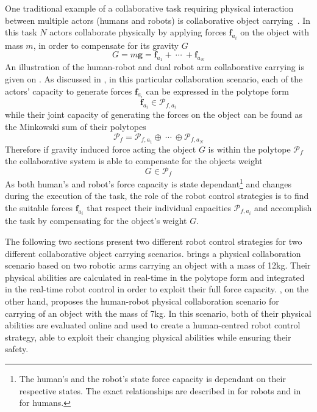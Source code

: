 One traditional example of a collaborative task requiring physical interaction between multiple actors (humans and robots) is collaborative object carrying~\cite{Arai2000carrying,Kosuge1997carrying,Tsumugiwa2002carrying}. In this task $N$ actors collaborate physically by applying forces $\bm{f}_{a_i}$ on the object with mass $m$, in order to compensate for its gravity $G$
\begin{equation}
    G=m\bm{g}=\bm{f}_{a_1} + ~\cdots ~+\bm{f}_{a_N}
\end{equation}
An illustration of the human-robot and dual robot arm collaborative carrying is given on . As discussed in , in this particular collaboration scenario, each of the actors' capacity to generate forces $\bm{f}_{a_i}$ can be expressed in the polytope form
\begin{equation}
    \bm{f}_{a_i} \in \mathcal{P}_{f,a_i}
\end{equation}
while their joint capacity of generating the forces on the object can be found as the Minkowski sum of their polytopes
\begin{equation}
    \mathcal{P}_f = \mathcal{P}_{f,a_1} \oplus~\cdots~\oplus \mathcal{P}_{f,a_N}
\end{equation}
Therefore if gravity induced force acting the object $G$ is within the polytope $\mathcal{P}_f$ the collaborative system is able to compensate for the objects weight
\begin{equation}
    G \in \mathcal{P}_f
\end{equation}
As both human's and robot's force capacity is state dependant\footnote{The human's and the robot's state force capacity is dependant on their respective states. The exact relationships are described in  for robots and in  for humans.} and changes during the execution of the task, the role of the robot control strategies is to find the suitable forces $\bm{f}_{a_i}$ that respect their individual capacities $\mathcal{P}_{f,a_i}$ and accomplish the task by compensating for the object's weight $G$. 

The following two sections present two different robot control strategies for two different collaborative object carrying scenarios.  brings a physical collaboration scenario based on two robotic arms carrying an object with a mass of 12kg. Their physical abilities are calculated in real-time in the polytope form and integrated in the real-time robot control in order to exploit their full force capacity. , on the other hand, proposes the human-robot physical collaboration scenario for carrying of an object with the mass of 7kg. In this scenario, both of their physical abilities are evaluated online and used to create a human-centred robot control strategy, able to exploit their changing physical abilities while ensuring their safety. 


